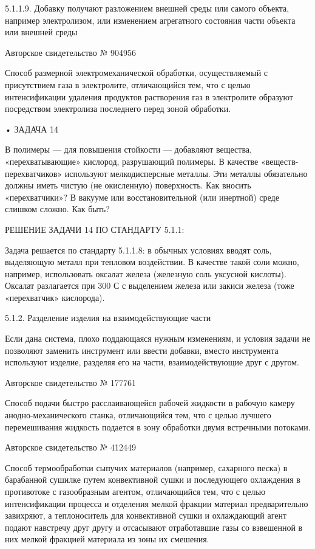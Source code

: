 5.1.1.9.  Добавку  получают  разложением   внешней  среды  или  самого
объекта, например  электролизом, или изменением  агрегатного состояния
части объекта или внешней среды

Авторское свидетельство № 904956

Способ  размерной  электромеханической   обработки,  осуществляемый  с
присутствием  газа  в  электролите,  отличающийся  тем,  что  с  целью
интенсификации  удаления  продуктов   растворения  газ  в  электролите
образуют посредством электролиза последнего перед зоной обработки.


• ЗАДАЧА 14

В   полимеры  —   для  повышения   стойкости  —   добавляют  вещества,
«перехватывающие»   кислород,   разрушающий   полимеры.   В   качестве
«веществ-перехватчиков»   используют   мелкодисперсные  металлы.   Эти
металлы обязательно  должны иметь чистую (не  окисленную) поверхность.
Как  вносить  «перехватчики»?  В вакууме  или  восстановительной  (или
инертной) среде слишком сложно. Как быть?


РЕШЕНИЕ ЗАДАЧИ 14 ПО СТАНДАРТУ 5.1.1:

Задача решается по стандарту 5.1.1.8:  в обычных условиях вводят соль,
выделяющую  металл при  тепловом  воздействии. В  качестве такой  соли
можно, например,  использовать оксалат железа (железную  соль уксусной
кислоты).  Оксалат разлагается  при  300 С  с  выделением железа  или
закиси железа (тоже «перехватчик» кислорода).


5.1.2. Разделение изделия на взаимодействующие части

Если  дана система,  плохо  поддающаяся нужным  изменениям, и  условия
задачи   не  позволяют   заменить  инструмент   или  ввести   добавки,
вместо  инструмента   используют  изделие,  разделяя  его   на  части,
взаимодействующие друг с другом.

Авторское свидетельство № 177761

Способ подачи быстро расслаивающейся рабочей жидкости в рабочую камеру
анодно-механического  станка, отличающийся  тем, что  с целью  лучшего
перемешивания  жидкость подается  в  зону  обработки двумя  встречными
потоками.

Авторское свидетельство № 412449

Способ термообработки сыпучих материалов (например, сахарного песка) в
барабанной сушилке путем конвективной  сушки и последующего охлаждения
в  противотоке  с  газообразным   агентом,  отличающийся  тем,  что  с
целью  интенсификации процесса  и  отделения  мелкой фракции  материал
предварительно  завихряют,  а  теплоноситель  для  конвективной  сушки
и  охлаждающий   агент  подают  навстречу  друг   другу  и  отсасывают
отработавшие газы  со взвешенной  в них  мелкой фракцией  материала из
зоны их смешения.


